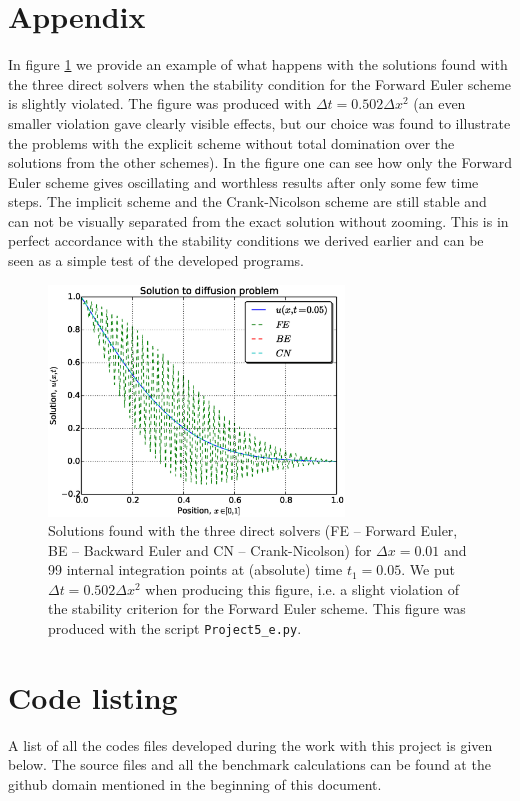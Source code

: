 \documentclass[a4paper, 11pt, notitlepage,english]{article}
\begin{document}
\section{Appendix}
In figure \ref{fig:Dt_violation} we provide an example of what happens with the solutions found with the three direct solvers when the stability condition for the Forward Euler scheme is slightly violated. The figure was produced with $\Delta t = 0.502 \Delta x^2$ (an even smaller violation gave clearly visible effects, but our choice was found to illustrate the problems with the explicit scheme without total domination over the solutions from the other schemes). In the figure one can see how only the Forward Euler scheme gives oscillating and worthless results after only some few time steps. The implicit scheme and the Crank-Nicolson scheme are still stable and can not be visually separated from the exact solution without zooming. This is in perfect accordance with the stability conditions we derived earlier and can be seen as a simple test of the developed programs.

\begin{figure}[h!tb]
 \centering
 \includegraphics[width=0.7\textwidth]{Violate_Dt}
 \caption{Solutions found with the three direct solvers (FE – Forward Euler, BE – Backward Euler and CN – Crank-Nicolson) for $\Delta x = 0.01$ and 99 internal integration points at (absolute) time $t_1 = 0.05$. We put $\Delta t = 0.502 \Delta x^2$ when producing this figure, i.e. a slight violation of the stability criterion for the Forward Euler scheme. This figure was produced with the script \texttt{Project5\_e.py}. }
\label{fig:Dt_violation}
\end{figure}



\section*{Code listing}
A list of all the codes files developed during the work with this project is given below. The source files and all the benchmark calculations can be found at the github domain mentioned in the beginning of this document. \\
\end{document}
